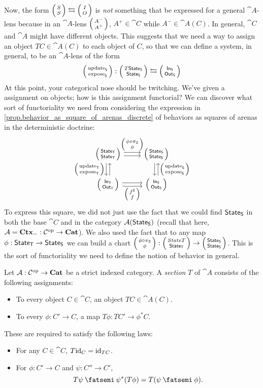 \documentclass[DynamicalBook]{subfiles}
\begin{document}
Now, the form $\lens{S}{S} \fromto \lens{I}{O}$ is \emph{not} something that be
expressed for a general $\cat{A}$-lens because in an $\cat{A}$-lens
$\lens{A^-}{A^+}$, $A^+ \in \cat{C}$ while $A^- \in \cat{A}(C)$. In general,
$\cat{C}$ and $\cat{A}$ might have different objects. This suggests that we need
a way to assign an object $TC \in \cat{A}(C)$ to each object of $C$, so that we
can define a system, in general, to be an $\cat{A}$-lens of the form 
\[
\lens{\update{S}}{\expose{S}} : \lens{T\State{S}}{\State{S}} \fromto
\lens{\In{S}}{\Out{S}}
\]
At this point, your categorical nose should be twitching. We've given a
assignment on objects; how is this assignment functorial? We can discover what
sort of functoriality we need from considering the expression in \cref{prop.behavior_as_square_of_arenas_discrete} of behaviors as
squares of arenas in the deterministic doctrine:
\[
    \begin{tikzcd}
      \lens{\State{T}}{\State{T}} \ar[r, shift left, "\lens{\phi \circ
        \pi_2}{\phi}"] \ar[r, shift right] \ar[d, shift right,
      "\lens{\update{T}}{\expose{T}}"'] \ar[d, shift left, leftarrow] &
      \lens{\State{S}}{\State{S}} \ar[d, shift left, leftarrow,
      "\lens{\update{S}}{\expose{S}}"] \ar[d, shift right]\\
      \lens{\In{T}}{\Out{T}} \ar[r, shift right, "\lens{f^{\sharp}}{f}"'] \ar[r,
      shift left] & \lens{\In{S}}{\Out{S}}
    \end{tikzcd}
  \]
To express this square, we did not just use the fact that we could find $\mathsf{State}_{\mathsf{S}}$
in both the base $\cat{C}$ and in the category $\mathcal{A}(\mathsf{State}_{\mathsf{S}})$ (recall that
here, $\mathcal{A} = \textbf{Ctx}_{-} : \mathcal{C}^{\textnormal{op}} \to \textbf{Cat}$). We also used the fact
that to any map $\phi : \mathsf{State}_{\mathsf{T}} \to \mathsf{State}_{\mathsf{S}}$ we can build a chart
$\lens{\phi \circ \pi_2}{\phi} : \lens{State{T}}{\State{T}} \to
\lens{\State{S}}{\State{S}}$. This is the sort of functoriality we need to
define the notion of behavior in general.

\begin{definition}
  Let $\mathcal{A} : \mathcal{C}^{\textnormal{op}} \to \textbf{Cat}$ be a strict indexed category. A
  \emph{section} $T$ of $\cat{A}$ consists of the following assignments:
  \begin{itemize}
    \item To every object $C \in \cat{C}$, an object $TC \in \cat{A}(C)$.
    \item To every $\phi : C' \to C$, a map $T\phi : TC' \to \phi^{\ast}C$.
  \end{itemize}
  These are required to satisfy the following laws:
  \begin{itemize}
    \item For any $C \in \cat{C}$, $T\mathrm{id}_C = \mathrm{id}_{TC}$.
    \item For $\phi : C' \to C$ and $\psi : C'' \to C'$,
      $$T\psi \then \psi^{\ast}(T\phi) = T(\psi \then \phi).$$
  \end{itemize}
\end{definition}
\end{document}
